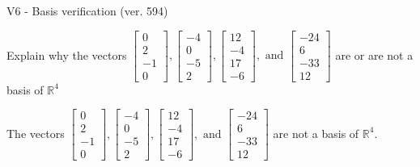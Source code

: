 \begin{exercise}
  \begin{exerciseTitle}V6 - Basis verification (ver. 594)\end{exerciseTitle}
  \begin{exerciseStatement}
    Explain why the vectors \(\left[\begin{array}{r}
0 \\
2 \\
-1 \\
0
\end{array}\right] , \left[\begin{array}{r}
-4 \\
0 \\
-5 \\
2
\end{array}\right] , \left[\begin{array}{r}
12 \\
-4 \\
17 \\
-6
\end{array}\right] , \text{ and } \left[\begin{array}{r}
-24 \\
6 \\
-33 \\
12
\end{array}\right]\) are or are not a basis of \(\mathbb{R}^4\)	


  \end{exerciseStatement}
  \begin{exerciseAnswer}
   The vectors \(\left[\begin{array}{r}
0 \\
2 \\
-1 \\
0
\end{array}\right] , \left[\begin{array}{r}
-4 \\
0 \\
-5 \\
2
\end{array}\right] , \left[\begin{array}{r}
12 \\
-4 \\
17 \\
-6
\end{array}\right] , \text{ and } \left[\begin{array}{r}
-24 \\
6 \\
-33 \\
12
\end{array}\right]\) 
  	 are not  a basis of \(\mathbb{R}^4\).
  


  \end{exerciseAnswer}
\end{exercise}